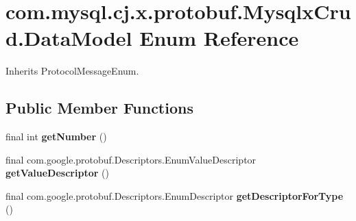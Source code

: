 \hypertarget{enumcom_1_1mysql_1_1cj_1_1x_1_1protobuf_1_1_mysqlx_crud_1_1_data_model}{}\section{com.\+mysql.\+cj.\+x.\+protobuf.\+Mysqlx\+Crud.\+Data\+Model Enum Reference}
\label{enumcom_1_1mysql_1_1cj_1_1x_1_1protobuf_1_1_mysqlx_crud_1_1_data_model}


Inherits Protocol\+Message\+Enum.

\subsection*{Public Member Functions}
\begin{DoxyCompactItemize}
\item 
\mbox{\label{enumcom_1_1mysql_1_1cj_1_1x_1_1protobuf_1_1_mysqlx_crud_1_1_data_model_a3da3a01de91c17efc8d89b03fd4f8055}} 
final int {\bfseries get\+Number} ()
\item 
\mbox{\label{enumcom_1_1mysql_1_1cj_1_1x_1_1protobuf_1_1_mysqlx_crud_1_1_data_model_a5f77d8ec1e3f09c4364d71a759806e56}} 
final com.\+google.\+protobuf.\+Descriptors.\+Enum\+Value\+Descriptor {\bfseries get\+Value\+Descriptor} ()
\item 
\mbox{\label{enumcom_1_1mysql_1_1cj_1_1x_1_1protobuf_1_1_mysqlx_crud_1_1_data_model_a66cd99042619d44a9eaff159f0b1e27e}} 
final com.\+google.\+protobuf.\+Descriptors.\+Enum\+Descriptor {\bfseries get\+Descriptor\+For\+Type} ()
\end{DoxyCompactItemize}
